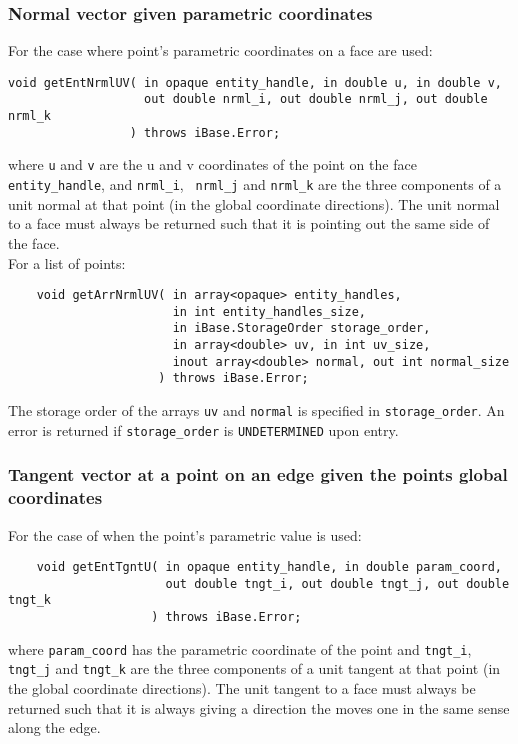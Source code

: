 \documentclass{article}
\begin{document}
\subsubsection{Normal vector given parametric coordinates}
For the case where point's parametric coordinates on a face 
are used:

\begin{verbatim}
void getEntNrmlUV( in opaque entity_handle, in double u, in double v,
                   out double nrml_i, out double nrml_j, out double nrml_k
                 ) throws iBase.Error;
\end{verbatim}
where {\tt u} and {\tt v} are the u and v coordinates of 
the point on the face {\tt entity\_handle}, and {\tt nrml\_i}, {\tt
  nrml\_j} and {\tt nrml\_k}
are the three components of a unit normal at that point (in the global 
coordinate directions). The unit normal to a face must always 
be returned such that it is pointing out the same side of the 
face.\\

\hspace{-16pt}For a list of points:

\begin{verbatim}
    void getArrNrmlUV( in array<opaque> entity_handles, 
                       in int entity_handles_size,
                       in iBase.StorageOrder storage_order,
                       in array<double> uv, in int uv_size,
                       inout array<double> normal, out int normal_size
                     ) throws iBase.Error;
\end{verbatim}
The storage order of the arrays {\tt uv} and {\tt normal} is specified
 in {\tt storage\_order}. An error is returned if {\tt storage\_order}
 is {\tt UNDETERMINED} upon entry.
 
\subsubsection{Tangent vector at a point on an edge given 
the points global coordinates}
For the case of when the point's parametric value is used:

\begin{verbatim}
    void getEntTgntU( in opaque entity_handle, in double param_coord,
                      out double tngt_i, out double tngt_j, out double tngt_k
                    ) throws iBase.Error;
\end{verbatim}
where {\tt param\_coord} has the parametric coordinate of 
the point and {\tt tngt\_i}, {\tt tngt\_j} and {\tt tngt\_k} are the three components of 
a unit tangent at that point (in the global coordinate directions). 
The unit tangent to a face must always be returned such that 
it is always giving a direction the moves one in the same sense 
along the edge.\\
\end{document}
